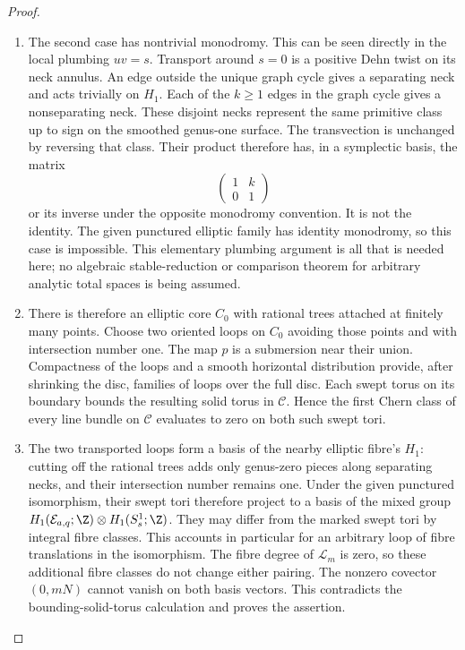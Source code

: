 \begin{proof}
\begin{enumerate}[label=\arabic*.,leftmargin=*]
\item The second case has nontrivial monodromy.  This can be
seen directly in the local plumbing $uv=s$.  Transport
around $s=0$ is a positive Dehn twist on its neck annulus.
An edge outside the unique graph cycle gives a separating
neck and acts trivially on $H_1$.  Each of the $k\ge1$
edges in the graph cycle gives a nonseparating neck.
These disjoint necks represent the same primitive class
up to sign on the smoothed genus-one surface.  The
transvection is unchanged by reversing that class.
Their product therefore has, in a symplectic basis, the
matrix
\[
  \begin{pmatrix}1&k\\0&1\end{pmatrix}
\]
or its inverse under the opposite monodromy convention.
It is not the identity.  The given punctured elliptic
family has identity monodromy, so this case is impossible.
This elementary plumbing argument is all that is needed
here; no algebraic stable-reduction or comparison theorem
for arbitrary analytic total spaces is being assumed.

\item There is therefore an elliptic core $C_0$ with rational
trees attached at finitely many points.  Choose two
oriented loops on $C_0$ avoiding those points and with
intersection number one.  The map $p$ is a submersion
near their union.  Compactness of the loops and a smooth
horizontal distribution provide, after shrinking the
disc, families of loops over the full disc.  Each swept
torus on its boundary bounds the resulting solid torus
in $\mathcal C$.  Hence the first Chern class of every
line bundle on $\mathcal C$ evaluates to zero on both
such swept tori.

\item The two transported loops form a basis of the nearby
elliptic fibre's $H_1$: cutting off the rational trees
adds only genus-zero pieces along separating necks,
and their intersection number remains one.  Under the
given punctured isomorphism, their swept tori therefore
project to a basis of the mixed group
$H_1(\mathcal E_{a,q};\Z)\otimes H_1(S_s^1;\Z)$.
They may differ from the marked swept tori by integral
fibre classes.  This accounts in particular for an
arbitrary loop of fibre translations in the isomorphism.
The fibre degree of $\mathcal L_m$ is zero, so these
additional fibre classes do not change either pairing.
The nonzero covector $(0,mN)$ cannot vanish on both
basis vectors.  This contradicts the bounding-solid-torus
calculation and proves the assertion.


\end{enumerate}
\end{proof}
